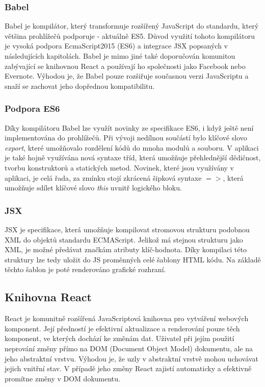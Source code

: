 \documentclass[a4paper,11pt,titlepage,fleqn]{article}
\begin{document}
        \subsubsection{Babel}
            Babel je kompilátor, který transformuje rozšířený JavaScript do standardu, který většina prohlížečů podporuje - aktuálně ES5. Důvod využití tohoto kompilátoru je vysoká podpora EcmaScript2015 (ES6) a integrace JSX popsaných v následujících kapitolách. Babel je mimo jiné také doporučován komunitou zabývající se knihovnou React a používají ho společnosti jako Facebook nebo Evernote. Výhodou je, že Babel pouze rozšiřuje současnou verzi JavaScriptu a snaží se zachovat jeho dopřednou kompatibilitu\cite{bib:babel}.

        \subsubsection{Podpora ES6}
            Díky kompilátoru Babel lze využít novinky ze specifikace ES6, i když ještě není implementována do prohlížečů. Při vývoji nedílnou součástí bylo klíčové slovo \textit{export}, které umožňovalo rozdělení kódů do mnoha modulů a souboru. V aplikaci je také hojně využívána nová syntaxe tříd, která umožňuje přehlednější dědičnost, tvorbu konstruktorů a statických metod. Novinek, které jsou využívány v aplikaci, je celá řada, za zmínku stojí zkrácená šipková syntaxe $=>$, která umožňuje sdílet klíčové slovo \textit{this} uvnitř logického bloku\cite{bib:ecma}. 

        \subsubsection{JSX}
            JSX je specifikace, která umožňuje kompilovat stromovou strukturu podobnou XML do objektů standardu ECMAScript\cite{bib:jsx}. Jelikož má stejnou strukturu jako XML, je možné předávat značkám atributy klíč-hodnota. Díky kompilaci této struktury lze tedy uložit do JS proměnných celé šablony HTML kódu. Na základě těchto šablon je poté renderováno grafické rozhraní.

    \subsection{Knihovna React}
        \label{react}
        React je komunitně rozšířená JavaScriptová knihovna pro vytváření webových komponent. Její předností je efektivní aktualizace a renderování pouze těch komponent, ve kterých dochází ke změnám dat. Uživatel při jejím použití neprování změny přímo na DOM (Document Object Model) dokumentu, ale na jeho abstraktní vrstvu. Výhodou je, že uzly v abstraktní vrstvě mohou uchovávat jejich vnitřní stav. V případě jeho změny React zajistí automaticky a efektivně promítne změny v DOM dokumentu. 
\end{document}
